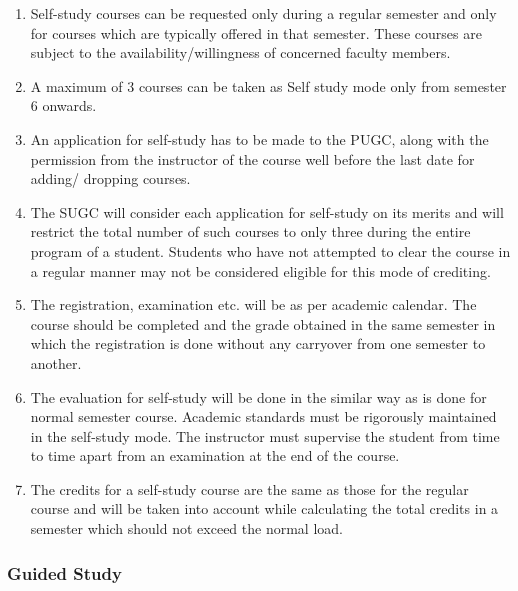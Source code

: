 \begin{enumerate}
    \item Self-study courses can be requested only during a regular semester and only for courses which are typically offered in that semester. These courses are subject to the availability/willingness of concerned faculty members.
    \item A maximum of 3 courses can be taken as Self study mode only from semester 6 onwards.
    \item An application for self-study has to be made to the PUGC, along with the permission from the instructor of the course well before the last date for adding/ dropping courses. 
    \item The SUGC will consider each application for self-study on its merits and will restrict the total number of such courses to only three during the entire program of a student. Students who have not attempted to clear the course in a regular manner may not be considered eligible for this mode of crediting. 
    \item The registration, examination etc. will be as per academic calendar. The course should be completed and the grade obtained in the same semester in which the registration is done without any carryover from one semester to another. 
    \item The evaluation for self-study will be done in the similar way as is done for normal semester course. Academic standards must be rigorously maintained in the self-study mode. The instructor must supervise the student from time to time apart from an examination at the end of the course.
    \item The credits for a self-study course are the same as those for the regular course and will be taken into account while calculating the total credits in a semester which should not exceed the normal load. 
\end{enumerate}

\subsubsection{Guided Study}

